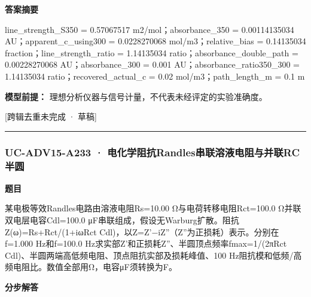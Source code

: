 \documentclass[UTF8,11pt,a4paper]{ctexart}
\begin{document}
\noindent\textbf{答案摘要}\par
line\_strength\_S350 = 0.57067517 m2/mol；absorbance\_350 = 0.00114135034 AU；apparent\_c\_using300 = 0.0228270068 mol/m3；relative\_bias = 0.14135034 fraction；line\_strength\_ratio = 1.14135034 ratio；absorbance\_double\_path = 0.00228270068 AU；absorbance\_300 = 0.001 AU；absorbance\_ratio350\_300 = 1.14135034 ratio；recovered\_actual\_c = 0.02 mol/m3；path\_length\_m = 0.1 m\par
\noindent\textbf{模型前提：}
理想分析仪器与信号计量，不代表未经评定的实验准确度。\par
\noindent\textcolor{red!65!black}{[跨辑去重未完成 · 草稿]} \par
\medskip\hrule\medskip
{}
\subsubsection*{UC-ADV15-A233 · 电化学阻抗Randles串联溶液电阻与并联RC半圆}
\noindent\textbf{题目}\par
某电极等效Randles电路由溶液电阻Rs=10.00 Ω与电荷转移电阻Rct=100.0 Ω并联双电层电容Cdl=100.0 μF串联组成，假设无Warburg扩散。阻抗Z(ω)=Rs+Rct/(1+iωRct Cdl)，以Z=Z'−iZ''（Z''为正损耗）表示。分别在f=1.000 Hz和f=100.0 Hz求实部Z'和正损耗Z''、半圆顶点频率fmax=1/(2πRct Cdl)、半圆两端高低频电阻、顶点阻抗实部及损耗峰值、100 Hz阻抗模和低频/高频电阻比。数值全部用Ω，电容μF须转换为F。\par
\medskip\noindent\textbf{分步解答}
\end{document}
